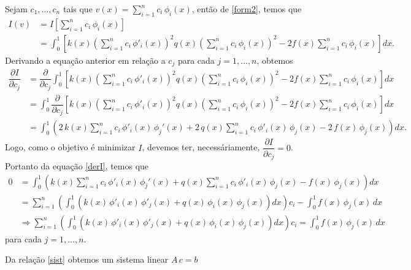 \documentclass[12pt,a4paper]{report}
\newcommand{\dis}{\displaystyle}
\newcommand{\pa}{\partial}
\begin{document}
Sejam $c_1,\dots,c_n$ tais que $v(x)=\dis\sum_{i=1}^nc_i\,\phi_i(x)$, então de \eqref{form2}, temos que
\begin{equation}
\begin{aligned}
I(v) &= I\left[\dis\sum_{i=1}^nc_i\,\phi_i(x) \right]\\
&= \dis\int_0^1\left[k(x)\left(\dis\sum_{i=1}^nc_i\,\phi'_i(x)\right)^2q(x)\left(\dis\sum_{i=1}^nc_i\,\phi_i(x)\right)^2-2f(x)\dis\sum_{i=1}^nc_i\,\phi_i(x)\right]dx.
\end{aligned}
\end{equation}  
Derivando a equação anterior em relação a $c_j$ para cada $j=1,\dots,n$, obtemos
\begin{equation}\label{derI}
\begin{aligned}
\dfrac{\pa I}{\pa c_j} &= \dfrac{\pa }{\pa c_j}\dis\int_0^1\left[k(x)\left(\dis\sum_{i=1}^nc_i\,\phi'_i(x)\right)^2q(x)\left(\dis\sum_{i=1}^nc_i\,\phi_i(x)\right)^2-2f(x)\dis\sum_{i=1}^nc_i\,\phi_i(x)\right]dx\\
&= \dis\int_0^1\dfrac{\pa}{\pa c_j}\left[k(x)\left(\dis\sum_{i=1}^nc_i\,\phi'_i(x)\right)^2q(x)\left(\dis\sum_{i=1}^nc_i\,\phi_i(x)\right)^2-2f(x)\dis\sum_{i=1}^nc_i\,\phi_i(x)\right]dx\\
&= \dis\int_0^1\left(2\,k(x)\dis\sum_{i=1}^nc_i\,\phi'_i(x)\,\phi_j'(x) + 2\,q(x)\dis\sum_{i=1}^nc_i\,\phi'_i(x)\,\phi_j(x) - 2\,f(x)\,\phi_j(x)\right)dx.
\end{aligned}
\end{equation}
Logo, como o objetivo é minimizar $I$, devemos ter, necessáriamente, $\dfrac{\pa I}{\pa c_j}=0$. Portanto da equação \eqref{derI}, temos que 
\begin{equation}\label{sist}
\begin{aligned}
0 &= \dis\int_0^1\left(k(x)\dis\sum_{i=1}^nc_i\,\phi'_i(x)\,\phi_j'(x) + q(x)\dis\sum_{i=1}^nc_i\,\phi'_i(x)\,\phi_j(x) - f(x)\,\phi_j(x)\right)dx\\
&= \dis\sum_{i=1}^n\left(\dis\int_0^1 (k(x)\,\phi'_i(x)\,\phi'_j(x) + q(x)\,\phi_i(x)\,\phi_j(x))dx\right)c_i - \dis\int_0^1f(x)\,\phi_j(x)\,dx\\
&\Longrightarrow \dis\sum_{i=1}^n\left(\dis\int_0^1 (k(x)\,\phi'_i(x)\,\phi'_j(x) + q(x)\,\phi_i(x)\,\phi_j(x))dx\right)c_i = \dis\int_0^1f(x)\,\phi_j(x)\,dx
\end{aligned}
\end{equation}
para cada $j=1,\dots,n$.

Da relação \eqref{sist} obtemos um sistema linear $A\,c=b$
\end{document}
